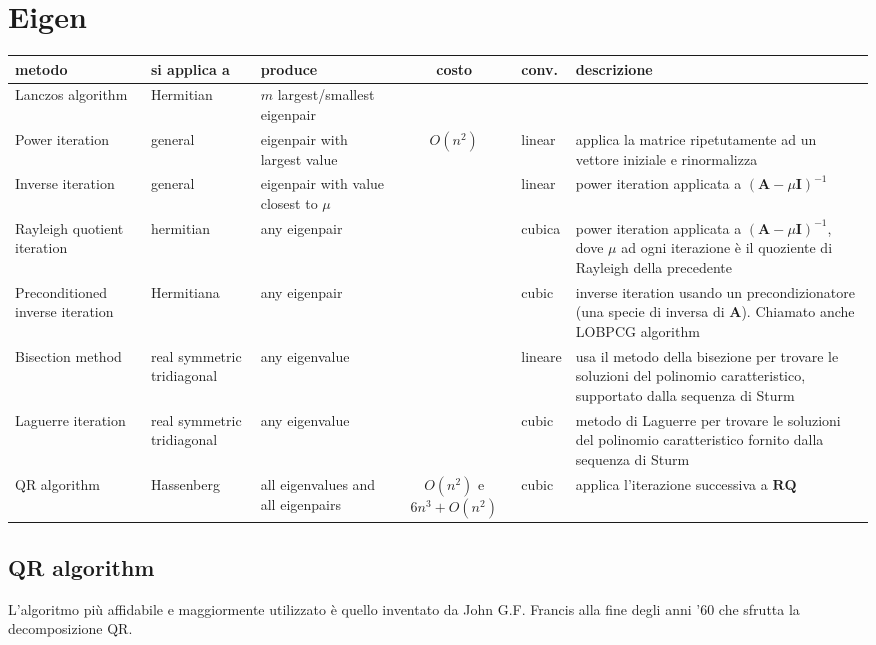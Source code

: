 \documentclass[10pt]{article}
\begin{document}
\section{Eigen}

\begin{tabular}{lllcll}
\textbf{metodo} & \textbf{si applica a} & \textbf{produce} & \textbf{costo} & \textbf{conv.} & \textbf{descrizione} \\
\hline
Lanczos algorithm & Hermitian & $m$ largest/smallest eigenpair & & & \\
Power iteration & general & eigenpair with largest value & $O(n^2)$ & linear & applica la matrice ripetutamente ad un vettore iniziale e rinormalizza \\
Inverse iteration & general & eigenpair with value closest to $\mu$ &  & linear & power iteration applicata a $(\mathbf{A} - \mu \mathbf{I})^{-1}$ \\
Rayleigh quotient iteration & hermitian & any eigenpair & & cubica & power iteration applicata a $(\mathbf{A} - \mu \mathbf{I})^{-1}$, dove $\mu$ ad ogni iterazione è il quoziente di Rayleigh della precedente \\
Preconditioned inverse iteration & Hermitiana & any eigenpair & & cubic & inverse iteration usando un precondizionatore (una specie di inversa di $\mathbf{A}$). Chiamato anche LOBPCG algorithm \\
Bisection method & real symmetric tridiagonal & any eigenvalue & & lineare & usa il metodo della bisezione per trovare le soluzioni del polinomio caratteristico, supportato dalla sequenza di Sturm \\
Laguerre iteration & real symmetric tridiagonal & any eigenvalue & & cubic & metodo di Laguerre per trovare le soluzioni del polinomio caratteristico fornito dalla sequenza di Sturm \\
QR algorithm & Hassenberg & all eigenvalues and all eigenpairs & $O(n^2)$ e $6n^3+O(n^2)$ & cubic & applica l'iterazione successiva a $\mathbf{R}\mathbf{Q}$ \\

\end{tabular}

\subsection{QR algorithm}

L'algoritmo più affidabile e maggiormente utilizzato è quello inventato da John G.F. Francis alla fine degli anni '60 che sfrutta la decomposizione QR.
\end{document}
